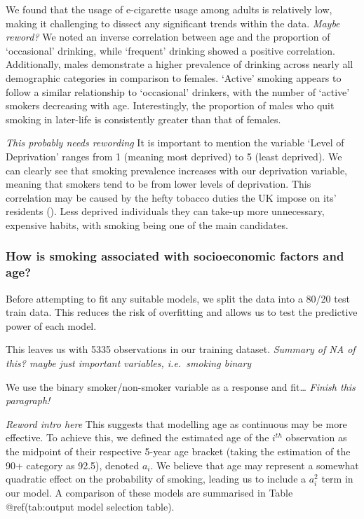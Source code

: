 \documentclass[
  11pt,
]{article}
\begin{document}
We found that the usage of e-cigarette usage among adults is relatively
low, making it challenging to dissect any significant trends within the
data. \emph{Maybe reword?} We noted an inverse correlation between age
and the proportion of `occasional' drinking, while `frequent' drinking
showed a positive correlation. Additionally, males demonstrate a higher
prevalence of drinking across nearly all demographic categories in
comparison to females. `Active' smoking appears to follow a similar
relationship to `occasional' drinkers, with the number of `active'
smokers decreasing with age. Interestingly, the proportion of males who
quit smoking in later-life is consistently greater than that of females.

\emph{This probably needs rewording} It is important to mention the
variable `Level of Deprivation' ranges from 1 (meaning most deprived) to
5 (least deprived). We can clearly see that smoking prevalence increases
with our deprivation variable, meaning that smokers tend to be from
lower levels of deprivation. This correlation may be caused by the hefty
tobacco duties the UK impose on its' residents
(). Less deprived individuals they can
take-up more unnecessary, expensive habits, with smoking being one of
the main candidates.

\subsubsection{How is smoking associated with socioeconomic factors and
age?}\label{how-is-smoking-associated-with-socioeconomic-factors-and-age}

Before attempting to fit any suitable models, we split the data into a
80/20 test train data. This reduces the risk of overfitting and allows
us to test the predictive power of each model.

This leaves us with 5335 observations in our training dataset.
\emph{Summary of NA of this? maybe just important variables,
i.e.~smoking binary}

We use the binary smoker/non-smoker variable as a response and
fit\ldots{} \emph{Finish this paragraph!}

\emph{Reword intro here} This suggests that modelling age as continuous
may be more effective. To achieve this, we defined the estimated age of
the \(i^{th}\) observation as the midpoint of their respective 5-year
age bracket (taking the estimation of the 90+ category as 92.5), denoted
\(a_i\). We believe that age may represent a somewhat quadratic effect
on the probability of smoking, leading us to include a \(a_i^2\) term in
our model. A comparison of these models are summarised in Table
@ref(tab:output model selection table).
\end{document}
